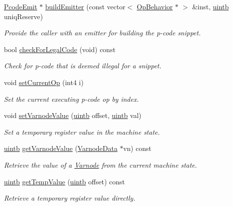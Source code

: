 \begin{DoxyCompactItemize}
\mbox{\hyperlink{class_pcode_emit}{Pcode\+Emit}} $\ast$ \mbox{\hyperlink{class_emulate_snippet_ad45023c5e4a7170496ef8acc48835d32}{build\+Emitter}} (const vector$<$ \mbox{\hyperlink{class_op_behavior}{Op\+Behavior}} $\ast$ $>$ \&inst, \mbox{\hyperlink{types_8h_a2db313c5d32a12b01d26ac9b3bca178f}{uintb}} uniq\+Reserve)
\begin{DoxyCompactList}\small\item\em Provide the caller with an emitter for building the p-\/code snippet. \end{DoxyCompactList}\item 
bool \mbox{\hyperlink{class_emulate_snippet_ad83f137b630e90877b05ea13f8d1d1be}{check\+For\+Legal\+Code}} (void) const
\begin{DoxyCompactList}\small\item\em Check for p-\/code that is deemed illegal for a {\itshape snippet}. \end{DoxyCompactList}\item 
void \mbox{\hyperlink{class_emulate_snippet_ace37ff31a80e1f296221195eeec4a4fb}{set\+Current\+Op}} (int4 i)
\begin{DoxyCompactList}\small\item\em Set the current executing p-\/code op by index. \end{DoxyCompactList}\item 
void \mbox{\hyperlink{class_emulate_snippet_abc4c1bf018f8ab3c0cea77fa927f5968}{set\+Varnode\+Value}} (\mbox{\hyperlink{types_8h_a2db313c5d32a12b01d26ac9b3bca178f}{uintb}} offset, \mbox{\hyperlink{types_8h_a2db313c5d32a12b01d26ac9b3bca178f}{uintb}} val)
\begin{DoxyCompactList}\small\item\em Set a temporary register value in the machine state. \end{DoxyCompactList}\item 
\mbox{\hyperlink{types_8h_a2db313c5d32a12b01d26ac9b3bca178f}{uintb}} \mbox{\hyperlink{class_emulate_snippet_af19946de88e6ea7dbf396648640fdb97}{get\+Varnode\+Value}} (\mbox{\hyperlink{struct_varnode_data}{Varnode\+Data}} $\ast$vn) const
\begin{DoxyCompactList}\small\item\em Retrieve the value of a \mbox{\hyperlink{class_varnode}{Varnode}} from the current machine state. \end{DoxyCompactList}\item 
\mbox{\hyperlink{types_8h_a2db313c5d32a12b01d26ac9b3bca178f}{uintb}} \mbox{\hyperlink{class_emulate_snippet_a77a5c0e4b9085b84e2d487568f9aa484}{get\+Temp\+Value}} (\mbox{\hyperlink{types_8h_a2db313c5d32a12b01d26ac9b3bca178f}{uintb}} offset) const
\begin{DoxyCompactList}\small\item\em Retrieve a temporary register value directly. \end{DoxyCompactList}\end{DoxyCompactItemize}
